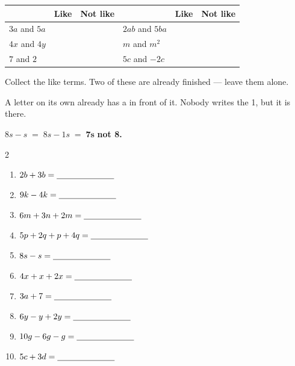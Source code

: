 \documentclass[12pt,a4paper]{article}
\begin{document}
\vspace{2pt}
\noindent
\begin{tabularx}{\textwidth}{|X|c|c|X|c|c|}
  \hline
  & \textbf{Like} & \textbf{Not like} & & \textbf{Like} & \textbf{Not like} \\
  \hline
  $3a$ and $5a$ \rule[-0.65em]{0pt}{2.0em}   & & &
  $2ab$ and $5ba$ \rule[-0.65em]{0pt}{2.0em} & & \\ \hline
  $4x$ and $4y$ \rule[-0.65em]{0pt}{2.0em}   & & &
  $m$ and $m^2$ \rule[-0.65em]{0pt}{2.0em}   & & \\ \hline
  $7$ and $2$ \rule[-0.65em]{0pt}{2.0em}     & & &
  $5c$ and $-2c$ \rule[-0.65em]{0pt}{2.0em}  & & \\ \hline
\end{tabularx}


\noindent Collect the like terms. Two of these are already finished --- leave them alone.

\begin{remember}[$x$ means $1x$]
  A letter on its own already has a  in front of it. Nobody writes the 1,
  but it is there.

  \smallskip
  \hspace*{1.2em}$8s - s \;=\; 8s - 1s \;=\; \mathbf{7s}$ \qquad
  {\color{cbred}\bfseries not 8.}
\end{remember}

\vspace{2pt}
\begin{multicols}{2}
\begin{enumerate}[label=(\alph*), itemsep=10pt]
  \item $2b + 3b = \blank[2.4cm]$
  \item $9k - 4k = \blank[2.4cm]$
  \item $6m + 3n + 2m = \blank[2.4cm]$
  \item $5p + 2q + p + 4q = \blank[2.4cm]$
  \item $8s - s = \blank[2.4cm]$
  \item $4x + x + 2x = \blank[2.4cm]$
  \item $3a + 7 = \blank[2.4cm]$
  \item $6y - y + 2y = \blank[2.4cm]$
  \item $10g - 6g - g = \blank[2.4cm]$
  \item $5c + 3d = \blank[2.4cm]$
\end{enumerate}
\end{multicols}
\end{document}
